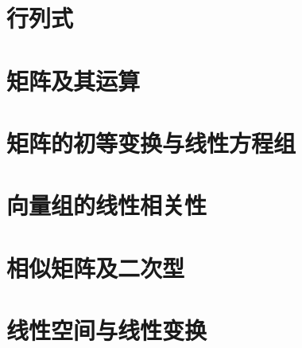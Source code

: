 \documentclass[11pt,a4paper,oneside,openany]{book}
\begin{document}

\frontmatter
\thispagestyle{fancy}
\tableofcontents
\mainmatter

\chapter{行列式}


\chapter{矩阵及其运算}


\chapter{矩阵的初等变换与线性方程组}


\chapter{向量组的线性相关性}


\chapter{相似矩阵及二次型}



\chapter{线性空间与线性变换}

\end{document}
